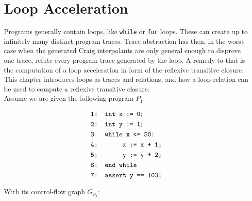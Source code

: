 \documentclass{article}
\begin{document}
\section{Loop Acceleration}
Programs generally contain loops, like \texttt{while} or \texttt{for} loops. These can create up to infinitely many distinct program traces. Trace abstraction has then, in the worst case when the generated Craig interpolants are only general enough to disprove one trace, refute every program trace generated by the loop. A remedy to that is the computation of a loop acceleration in form of the reflexive transitive closure. This chapter introduces loops as traces and relations, and how a loop relation can be used to compute a reflexive transitive closure. \\

Assume we are given the following program $P_1$: \\
\begin{figure}[H]
	\begin{align*}
		&\texttt{1: int x := 0}; \\
		&\texttt{2: int y := 1}; \\
		&\texttt{3: while x <= 50:} \\
		&\texttt{4: \hspace*{2em} x := x + 1;} \\
		&\texttt{5: \hspace*{2em} y := y + 2;} \\
		&\texttt{6: end while} \\
		&\texttt{7: assert y == 103;}
	\end{align*}
	\label{fig:square}
\end{figure}
With its control-flow graph $G_{P_1}$: \\
\end{document}
